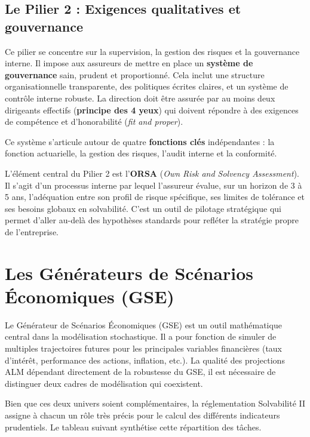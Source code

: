 \subsection{Le Pilier 2 : Exigences qualitatives et gouvernance}

Ce pilier se concentre sur la supervision, la gestion des risques et la gouvernance interne. Il impose aux assureurs de mettre en place un \textbf{système de gouvernance} sain, prudent et proportionné. Cela inclut une structure organisationnelle transparente, des politiques écrites claires, et un système de contrôle interne robuste. La direction doit être assurée par au moins deux dirigeants effectifs (\textbf{principe des 4 yeux}) qui doivent répondre à des exigences de compétence et d'honorabilité (\textit{fit and proper}).



Ce système s'articule autour de quatre \textbf{fonctions clés} indépendantes : la fonction actuarielle, la gestion des risques, l'audit interne et la conformité.



L'élément central du Pilier 2 est l'\textbf{ORSA} (\textit{Own Risk and Solvency Assessment}). Il s'agit d'un processus interne par lequel l'assureur évalue, sur un horizon de 3 à 5 ans, l'adéquation entre son profil de risque spécifique, ses limites de tolérance et ses besoins globaux en solvabilité. C'est un outil de pilotage stratégique qui permet d'aller au-delà des hypothèses standards pour refléter la stratégie propre de l'entreprise.

\section{Les Générateurs de Scénarios Économiques (GSE)}
\label{sec:gse}

Le Générateur de Scénarios Économiques (GSE) est un outil mathématique central dans la modélisation stochastique. Il a pour fonction de simuler de multiples trajectoires futures pour les principales variables financières (taux d'intérêt, performance des actions, inflation, etc.). La qualité des projections ALM dépendant directement de la robustesse du GSE, il est nécessaire de distinguer deux cadres de modélisation qui coexistent.

Bien que ces deux univers soient complémentaires, la réglementation Solvabilité II assigne à chacun un rôle très précis pour le calcul des différents indicateurs prudentiels. Le tableau suivant synthétise cette répartition des tâches.

